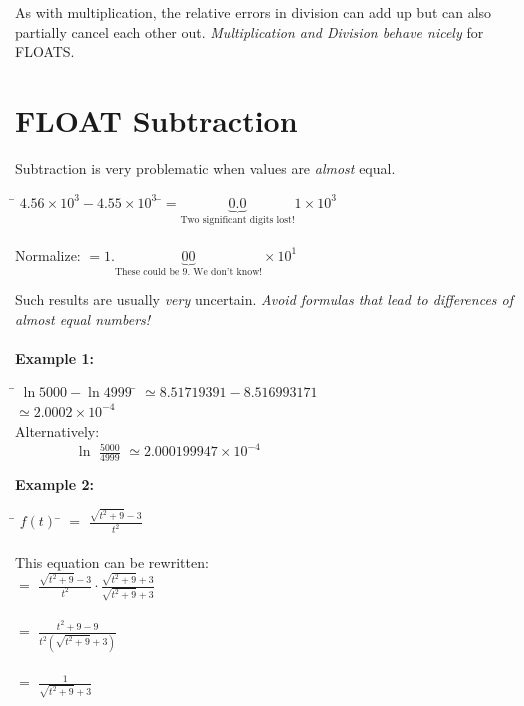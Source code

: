 \documentclass[a4paper,12pt,]{report}
\begin{document}
	As with multiplication, the relative errors in division can add up but can also partially cancel each 
	other out. \textit{Multiplication and Division behave nicely }for FLOATS.


\section{FLOAT Subtraction}

	Subtraction is very problematic when values are \textit{almost}  equal.

\begin{tabbing}
	\hspace{3cm}\= $4.56 \times 10^3 - 4.55 \times 10^3$
	\hspace{0.1cm}\=$ = \!\!\!\!\!\!\!\!\!\!\!\!\!\!\!\!\!\!\underbrace{0.0}_{\text{Two significant digits 
	lost!}} \!\!\!\!\!\!\!\!\!\!\!\!\!\!\!\!\!\!\!\!\!\! 1 \times 10^3$\\ \\
	Normalize: \>\>$=1.\!\!\!\!\!\!\!\!\!\!\!\!\!\!\!\!\!\!\!\!\!\!\!\!\!\!\!\!\!\!
		\underbrace{00}_{\text{These could be 9. We don't know!}}
		\!\!\!\!\!\!\!\!\!\!\!\!\!\!\!\!\!\!\!\!\!\!\!\!\!\!\!\!\! \times 10^1$
\end{tabbing}
	
	Such results are usually \textit{very} uncertain. \textit{Avoid formulas that lead to differences of 
	almost equal numbers!}\\ \\

	\noindent \textbf{Example 1:}

\begin{tabbing}
	\hspace*{4cm} \= $\ln5000-\ln4999$ \hspace*{0.1cm}\= $\simeq 8.51719391 - 8.516993171$\\
	\> \> $\simeq 2.0002 \times10^{-4}$ \\
	Alternatively:\\
	\> $\qquad \qquad \; \ln$ \Large{$\!\frac{5000}{4999}$}\> $\simeq 2.000199947
		\times 10^{-4}$
\end{tabbing}

	\noindent \textbf{Example 2:}

\begin{tabbing}
	\hspace*{4cm} \= $f(t)$ \hspace*{0.1cm} \= $\!\! =$ \Large{$\frac{\sqrt{t^2+9}-3}{t^2}$}\\ \\
	This equation can be rewritten:\\
	\> \>$\!\! =$ \Large{$\frac{\sqrt{t^2+9}-3}{t^2} \cdot
		\frac{\sqrt{t^2+9}+3}{\sqrt{t^2+9}+3}$}\\ \\
	\> \> $\!\! =$ \Large{$\frac{t^2+9-9}{t^2(\sqrt{t^2+9}+3)}$}\\ \\
	\> \> $\!\! =$ \Large{$\frac{1}{\sqrt{t^2+9}+3}$}\\
\end{tabbing}
\end{document}

